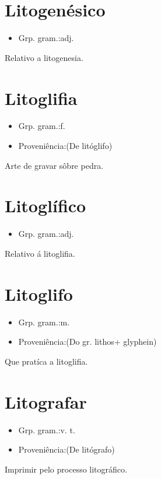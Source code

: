 \section{Litogenésico}
\begin{itemize}
\item {Grp. gram.:adj.}
\end{itemize}
Relativo a litogenesia.
\section{Litoglifia}
\begin{itemize}
\item {Grp. gram.:f.}
\end{itemize}
\begin{itemize}
\item {Proveniência:(De \textunderscore litóglifo\textunderscore )}
\end{itemize}
Arte de gravar sôbre pedra.
\section{Litoglífico}
\begin{itemize}
\item {Grp. gram.:adj.}
\end{itemize}
Relativo á litoglifia.
\section{Litoglifo}
\begin{itemize}
\item {Grp. gram.:m.}
\end{itemize}
\begin{itemize}
\item {Proveniência:(Do gr. \textunderscore lithos\textunderscore  + \textunderscore glyphein\textunderscore )}
\end{itemize}
Que pratíca a litoglifia.
\section{Litografar}
\begin{itemize}
\item {Grp. gram.:v. t.}
\end{itemize}
\begin{itemize}
\item {Proveniência:(De \textunderscore litógrafo\textunderscore )}
\end{itemize}
Imprimir pelo processo litográfico.
